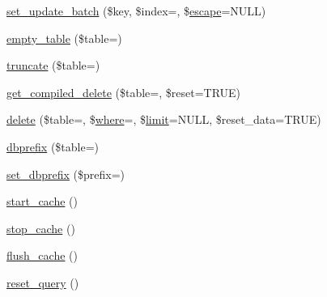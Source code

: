 \begin{DoxyCompactItemize}
\item 
\mbox{\hyperlink{class_c_i___d_b__query__builder_a7f212748fce6348224257ff09dec873a}{set\+\_\+update\+\_\+batch}} (\$key, \$index=\textquotesingle{}\textquotesingle{}, \$\mbox{\hyperlink{class_c_i___d_b__driver_ac8f37ca5703d4558c732e692194f8cd6}{escape}}=N\+U\+LL)
\item 
\mbox{\hyperlink{class_c_i___d_b__query__builder_af665fbf0b83f396d6c5529aca1f43517}{empty\+\_\+table}} (\$table=\textquotesingle{}\textquotesingle{})
\item 
\mbox{\hyperlink{class_c_i___d_b__query__builder_acaa636a6a61d4362c5a32941fc9932ba}{truncate}} (\$table=\textquotesingle{}\textquotesingle{})
\item 
\mbox{\hyperlink{class_c_i___d_b__query__builder_a3e2f8775363646e099009ff62b25a21a}{get\+\_\+compiled\+\_\+delete}} (\$table=\textquotesingle{}\textquotesingle{}, \$reset=T\+R\+UE)
\item 
\mbox{\hyperlink{class_c_i___d_b__query__builder_a482722b9989c53ed8ecd68b22df64507}{delete}} (\$table=\textquotesingle{}\textquotesingle{}, \$\mbox{\hyperlink{class_c_i___d_b__query__builder_a2356c4b7b93fb83c62a354a8a0748222}{where}}=\textquotesingle{}\textquotesingle{}, \$\mbox{\hyperlink{class_c_i___d_b__query__builder_a875b0d4703f176c36e771d728a9a04a0}{limit}}=N\+U\+LL, \$reset\+\_\+data=T\+R\+UE)
\item 
\mbox{\hyperlink{class_c_i___d_b__query__builder_a98b692562f4990d04d161d0408061ed8}{dbprefix}} (\$table=\textquotesingle{}\textquotesingle{})
\item 
\mbox{\hyperlink{class_c_i___d_b__query__builder_a5349738c8f19329c8e074be683cd9015}{set\+\_\+dbprefix}} (\$prefix=\textquotesingle{}\textquotesingle{})
\item 
\mbox{\hyperlink{class_c_i___d_b__query__builder_a2d4f0c7b71f87dc7ca7f7fcfbdd12ba0}{start\+\_\+cache}} ()
\item 
\mbox{\hyperlink{class_c_i___d_b__query__builder_a612e54a6230b7e899c4d2a42a234bd5a}{stop\+\_\+cache}} ()
\item 
\mbox{\hyperlink{class_c_i___d_b__query__builder_aa3c94d79d552f6e10277b01c447ebbb6}{flush\+\_\+cache}} ()
\item 
\mbox{\hyperlink{class_c_i___d_b__query__builder_a66636a017a1115d983424cdfca677ddf}{reset\+\_\+query}} ()
\end{DoxyCompactItemize}
